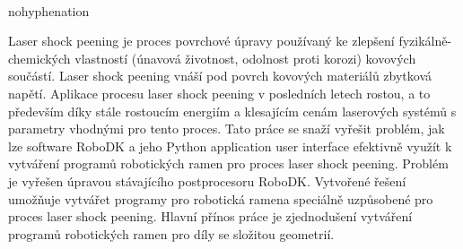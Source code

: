 ﻿%
﻿
\begin{hyphenrules}{nohyphenation}

Laser shock peening je proces povrchové úpravy používaný ke zlepšení fyzikálně-chemických vlastností (únavová životnost, odolnost proti korozi) kovových součástí. Laser shock peening vnáší pod povrch kovových materiálů zbytková napětí. Aplikace procesu laser shock peening v posledních letech rostou, a to především díky stále rostoucím energiím a klesajícím cenám laserových systémů s parametry vhodnými pro tento proces. Tato práce se snaží vyřešit problém, jak lze software RoboDK a jeho Python application user interface efektivně využít k vytváření programů robotických ramen pro proces laser shock peening. Problém je vyřešen úpravou stávajícího postprocesoru RoboDK. Vytvořené řešení umožňuje vytvářet programy pro robotická ramena speciálně uzpůsobené pro proces laser shock peening. Hlavní přínos práce je zjednodušení vytváření programů robotických ramen pro díly se složitou geometrií. 

\end{hyphenrules}

